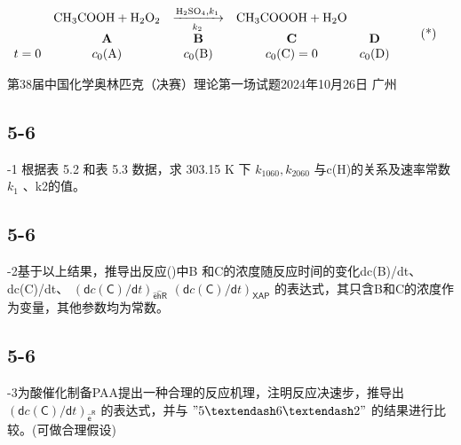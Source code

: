 $
\begin{array}{c c c c c} & \mathrm {CH_ {3} COOH} + \mathrm {H_ {2} O_ {2}} & \xrightarrow [ k _ {2} ]{\mathrm {H_ {2} SO_ {4}} , k _ {1}} & \mathrm {CH_ {3} COOOH} + \mathrm {H_ {2} O} \\ & \mathbf {A} & \mathbf {B} & \mathbf {C} & \mathbf {D} \\ t = 0 & c _ {0} (\mathrm{A}) & c _ {0} (\mathrm{B}) & c _ {0} (\mathrm{C}) = 0 & c _ {0} (\mathrm{D}) \end{array}\tag{*}
$

第38届中国化学奥林匹克（决赛）理论第一场试题2024年10月26日 广州

\subsection*{5-6}
-1 根据表 5.2 和表 5.3 数据，求 303.15 K 下 $k _ { 1 0 6 0 } , k _ { 2 0 6 0 }$ 与c(H)的关系及速率常数$k _ { 1 }$ 、k2的值。

\subsection*{5-6}
-2基于以上结果，推导出反应(\*)中B 和C的浓度随反应时间的变化dc(B)/dt、dc(C)/dt、 $( \mathsf { d } c ( \mathsf { C } ) / \mathsf { d } t ) _ { \widehat { \mathsf { e } } \widehat { \mathsf { h } } \mathsf { R } }$ $( \mathsf { d } c ( \mathsf { C } ) / \mathsf { d } t ) _ { \mathsf { X } \mathsf { A } \mathsf { P } }$ 的表达式，其只含B和C的浓度作为变量，其他参数均为常数。

\subsection*{5-6}
-3为酸催化制备PAA提出一种合理的反应机理，注明反应决速步，推导出$( \mathsf { d } c ( \mathsf { C } ) / \mathsf { d } t ) _ { \widehat { \mathsf { e } } ^ { \mathsf { R } } }$ 的表达式，并与 $" 5  – 6 – 2 "$ 的结果进行比较。(可做合理假设)
